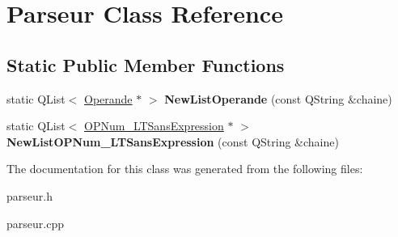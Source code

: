 \hypertarget{class_parseur}{}\section{Parseur Class Reference}
\label{class_parseur}
\subsection*{Static Public Member Functions}
\begin{DoxyCompactItemize}
\item 
static Q\+List$<$ \hyperlink{class_operande}{Operande} $\ast$ $>$ {\bfseries New\+List\+Operande} (const Q\+String \&chaine)\hypertarget{class_parseur_ad4ccbd4c6a37c367831ab6388c0802bc}{}\label{class_parseur_ad4ccbd4c6a37c367831ab6388c0802bc}

\item 
static Q\+List$<$ \hyperlink{class_o_p_num___l_t_sans_expression}{O\+P\+Num\+\_\+\+L\+T\+Sans\+Expression} $\ast$ $>$ {\bfseries New\+List\+O\+P\+Num\+\_\+\+L\+T\+Sans\+Expression} (const Q\+String \&chaine)\hypertarget{class_parseur_aa8fd6265a08f5bec6f2a90fed7fd0416}{}\label{class_parseur_aa8fd6265a08f5bec6f2a90fed7fd0416}

\end{DoxyCompactItemize}


The documentation for this class was generated from the following files\+:\begin{DoxyCompactItemize}
\item 
parseur.\+h\item 
parseur.\+cpp\end{DoxyCompactItemize}
